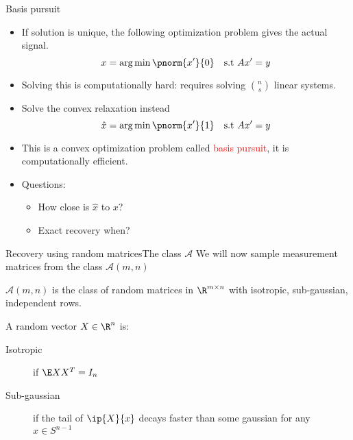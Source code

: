 \documentclass{beamer}
\begin{document}
\begin{frame}{Basis pursuit}
	\begin{itemize}
		\item If solution is unique, the following optimization problem
			gives the actual signal.
			\[
				x = \arg\min\pnorm{x'}{0}\quad \text{s.t } Ax' = y
			\]
			
			\pause

		\item Solving this is computationally hard: requires
			solving $\binom{n}{s}$ linear systems.

			\pause

		\item Solve the convex relaxation instead
			\[
				\hat{x} = \arg\min\pnorm{x'}{1}\quad \text{s.t } Ax' = y
			\]

			\pause

		\item This is a convex optimization problem called
			\textcolor{red}{basis pursuit}, it is computationally
			efficient.

			\pause

		\item Questions:
			\begin{itemize}
				\item How close is $\hat{x}$ to $x$?					
				\item Exact recovery when?
			\end{itemize}
	\end{itemize}
\end{frame}


\begin{frame}{Recovery using random matrices}{The class $\mathcal{A}$}
	We will now sample measurement matrices from the class
	$\mathcal{A}(m, n)$
	\begin{definition}
		$\mathcal{A}(m, n)$ is the class of random matrices in
		$\R^{m\times n}$ with
		isotropic, sub-gaussian, independent rows.
	\end{definition}
	
\pause

	A random vector $X\in\R^n$ is:
	\begin{description}
		\item[Isotropic] if $\E XX^T = I_n$
			\pause
		\item[Sub-gaussian] if the tail of $\ip{X}{x}$ decays
			faster than some gaussian for any $x\in S^{n-1}$
	\end{description}
\end{frame}
\end{document}
